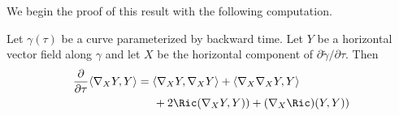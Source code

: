 We begin the proof of this result with the following computation.

\begin{claim}\label{claim:covariant-derivative-inner-product-formula}
  Let
$\gamma(\tau)$ be a curve parameterized by backward time. Let $Y$ be
a horizontal vector field along $\gamma$ and let $X$ be the
horizontal component of $\partial\widetilde\gamma/\partial \tau$.
Then
\begin{align*}\frac{\partial}{\partial\tau}\langle \nabla_{ X}Y, Y\rangle
 &= \langle \nabla_{ X} Y, \nabla_{ X} Y\rangle  + \langle
\nabla_{ X}\nabla_{ X} Y, Y\rangle
\\&\hspace{0.5cm} +2\Ric(\nabla_XY,Y)) +(\nabla_X\Ric)(Y,Y))\end{align*}
\end{claim}

